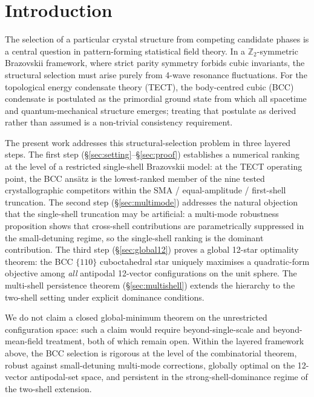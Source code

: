 \maketitle

\section{Introduction}
The selection of a particular crystal structure from competing
candidate phases is a central question in pattern-forming statistical
field theory. In a $\mathbb{Z}_2$-symmetric Brazovskii framework,
where strict parity symmetry forbids cubic invariants, the structural
selection must arise purely from 4-wave resonance fluctuations. For
the topological energy condensate theory (TECT), the body-centred
cubic (BCC) condensate is postulated as the primordial ground state
from which all spacetime and quantum-mechanical structure emerges;
treating that postulate as derived rather than assumed is a non-trivial
consistency requirement.

The present work addresses this structural-selection problem in three
layered steps. The first step (\S\ref{sec:setting}--\S\ref{sec:proof})
establishes a numerical ranking at the level of a restricted
single-shell Brazovskii model: at the TECT operating point, the BCC
ans\"atz is the lowest-ranked member of the nine tested
crystallographic competitors within the SMA / equal-amplitude /
first-shell truncation. The second step (\S\ref{sec:multimode})
addresses the natural objection that the single-shell truncation may
be artificial: a multi-mode robustness proposition shows that
cross-shell contributions are parametrically suppressed in the
small-detuning regime, so the single-shell ranking is the dominant
contribution. The third step (\S\ref{sec:global12}) proves a global
12-star optimality theorem: the BCC $\{110\}$ cuboctahedral star
uniquely maximises a quadratic-form objective among \emph{all}
antipodal 12-vector configurations on the unit sphere. The
multi-shell persistence theorem (\S\ref{sec:multishell}) extends the
hierarchy to the two-shell setting under explicit dominance conditions.

We do not claim a closed global-minimum theorem on the unrestricted
configuration space: such a claim would require beyond-single-scale
and beyond-mean-field treatment, both of which remain open.
Within the layered framework above, the BCC selection is rigorous at
the level of the combinatorial theorem, robust against
small-detuning multi-mode corrections, globally optimal on the
12-vector antipodal-set space, and persistent in the
strong-shell-dominance regime of the two-shell extension.

